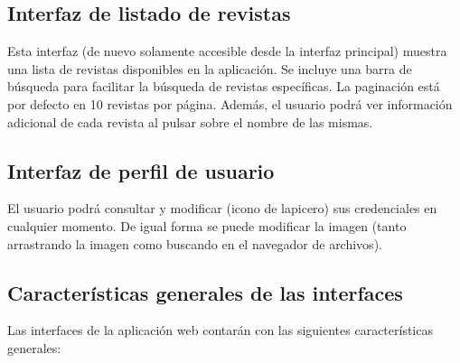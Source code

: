
\subsection{Interfaz de listado de revistas}
Esta interfaz (de nuevo solamente accesible desde la interfaz principal) muestra una lista de revistas disponibles en la aplicación. Se incluye una barra de búsqueda para facilitar la búsqueda de revistas específicas. La paginación está por defecto en 10 revistas por página. Además, el usuario podrá ver información adicional de cada revista al pulsar sobre el nombre de las mismas.


\subsection{Interfaz de perfil de usuario}
El usuario podrá consultar y modificar (icono de lapicero) sus credenciales en cualquier momento. De igual forma se puede modificar la imagen (tanto arrastrando la imagen como buscando en el navegador de archivos).


\subsection{Características generales de las interfaces}
Las interfaces de la aplicación web contarán con las siguientes características generales:

